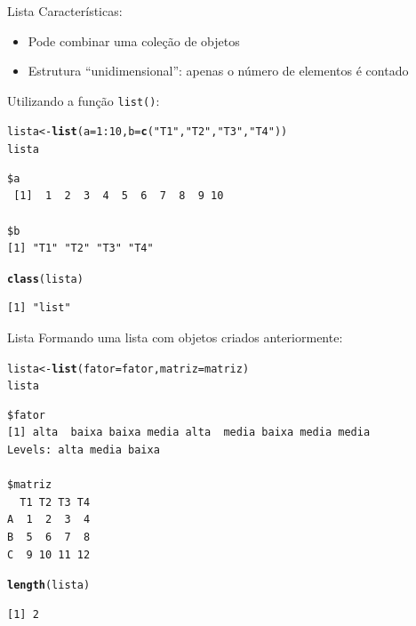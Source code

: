 \documentclass[10pt,handout]{beamer}\usepackage[]{graphicx}\usepackage[]{color}
\makeatletter
\newcommand{\hlnum}[1]{\textcolor[rgb]{0.686,0.059,0.569}{#1}}%
\newcommand{\hlstr}[1]{\textcolor[rgb]{0.282,0.239,0.545}{#1}}%
\newcommand{\hlopt}[1]{\textcolor[rgb]{0,0,0}{#1}}%
\newcommand{\hlstd}[1]{\textcolor[rgb]{0.345,0.345,0.345}{#1}}%
\newcommand{\hlkwb}[1]{\textcolor[rgb]{0.69,0.353,0.396}{#1}}%
\newcommand{\hlkwc}[1]{\textcolor[rgb]{0.333,0.667,0.333}{#1}}%
\newcommand{\hlkwd}[1]{\textcolor[rgb]{0.282,0.239,0.545}{\textbf{#1}}}%
\newenvironment{kframe}{%
 \def\at@end@of@kframe{}%
 \ifinner\ifhmode%
  \def\at@end@of@kframe{\end{minipage}}%
  \begin{minipage}{\columnwidth}%
 \fi\fi%
 \def\FrameCommand##1{\hskip\@totalleftmargin \hskip-\fboxsep
 \colorbox{shadecolor}{##1}\hskip-\fboxsep
     \hskip-\linewidth \hskip-\@totalleftmargin \hskip\columnwidth}%
 \MakeFramed {\advance\hsize-\width
   \@totalleftmargin\z@ \linewidth\hsize
   \@setminipage}}%
 {\par\unskip\endMakeFramed%
 \at@end@of@kframe}
\newenvironment{knitrout}{}{} %
\makeatother
\begin{document}
\begin{frame}[fragile]{Lista}
Características:
\begin{itemize}
\item Pode combinar uma coleção de objetos
\item Estrutura ``unidimensional'': apenas o número de elementos é
  contado
\end{itemize}
Utilizando a função \texttt{list()}:
\begin{knitrout}\small
{}\color{fgcolor}\begin{kframe}
\begin{alltt}
\hlstd{lista} \hlkwb{<-} \hlkwd{list}\hlstd{(}\hlkwc{a} \hlstd{=} \hlnum{1}\hlopt{:}\hlnum{10}\hlstd{,} \hlkwc{b} \hlstd{=} \hlkwd{c}\hlstd{(}\hlstr{"T1"}\hlstd{,}\hlstr{"T2"}\hlstd{,}\hlstr{"T3"}\hlstd{,}\hlstr{"T4"}\hlstd{))}
\hlstd{lista}
\end{alltt}
\begin{verbatim}
$a
 [1]  1  2  3  4  5  6  7  8  9 10

$b
[1] "T1" "T2" "T3" "T4"
\end{verbatim}
\begin{alltt}
\hlkwd{class}\hlstd{(lista)}
\end{alltt}
\begin{verbatim}
[1] "list"
\end{verbatim}
\end{kframe}
\end{knitrout}

\end{frame}

\begin{frame}[fragile]{Lista}
Formando uma lista com objetos criados anteriormente:
\begin{knitrout}\small
{}\color{fgcolor}\begin{kframe}
\begin{alltt}
\hlstd{lista} \hlkwb{<-} \hlkwd{list}\hlstd{(}\hlkwc{fator} \hlstd{= fator,} \hlkwc{matriz} \hlstd{= matriz)}
\hlstd{lista}
\end{alltt}
\begin{verbatim}
$fator
[1] alta  baixa baixa media alta  media baixa media media
Levels: alta media baixa

$matriz
  T1 T2 T3 T4
A  1  2  3  4
B  5  6  7  8
C  9 10 11 12
\end{verbatim}
\begin{alltt}
\hlkwd{length}\hlstd{(lista)}
\end{alltt}
\begin{verbatim}
[1] 2
\end{verbatim}
\end{kframe}
\end{knitrout}

\end{frame}
\end{document}
